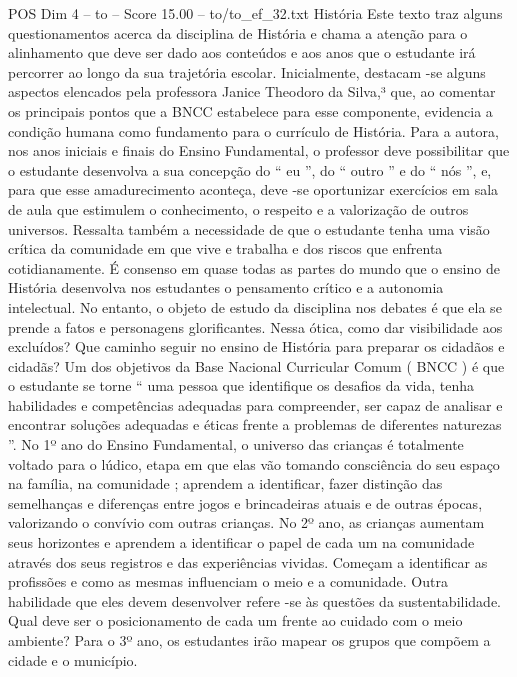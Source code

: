 \begin{textsample}{POS Dim 4 – to – Score 15.00 – to/to\_ef\_32.txt}  \label{ex:f4_pos_201}
História Este texto traz alguns questionamentos acerca da disciplina de História e chama a atenção para o alinhamento que deve ser dado aos conteúdos e aos anos que o estudante irá percorrer ao longo da sua trajetória escolar.
Inicialmente, destacam -se alguns aspectos elencados pela professora Janice Theodoro da Silva,³ que, ao comentar os principais pontos que a BNCC estabelece para esse componente, evidencia a condição humana como fundamento para o currículo de História.
Para a autora, nos anos iniciais e finais do Ensino Fundamental, o professor deve possibilitar que o estudante desenvolva a sua concepção do “ eu ”, do “ outro ” e do “ nós ”, e, para que esse amadurecimento aconteça, deve -se oportunizar exercícios em sala de aula que estimulem o conhecimento, o respeito e a valorização de outros universos.
Ressalta também a necessidade de que o estudante tenha uma visão crítica da comunidade em que vive e trabalha e dos riscos que enfrenta cotidianamente.
É consenso em quase todas as partes do mundo que o ensino de História desenvolva nos estudantes o pensamento crítico e a autonomia intelectual.
No entanto, o objeto de estudo da disciplina nos debates é que ela se prende a fatos e personagens glorificantes.
Nessa ótica, como dar visibilidade aos excluídos?
Que caminho seguir no ensino de História para preparar os cidadãos e cidadãs?
Um dos objetivos da Base Nacional Curricular Comum ( BNCC ) é que o estudante se torne “ uma pessoa que identifique os desafios da vida, tenha habilidades e competências adequadas para compreender, ser capaz de analisar e encontrar soluções adequadas e éticas frente a problemas de diferentes naturezas ”.
No 1º ano do Ensino Fundamental, o universo das crianças é totalmente voltado para o lúdico, etapa em que elas vão tomando consciência do seu espaço na família, na comunidade ; aprendem a identificar, fazer distinção das semelhanças e diferenças entre jogos e brincadeiras atuais e de outras épocas, valorizando o convívio com outras crianças.
No 2º ano, as crianças aumentam seus horizontes e aprendem a identificar o papel de cada um na comunidade através dos seus registros e das experiências vividas.
Começam a identificar as profissões e como as mesmas influenciam o meio e a comunidade.
Outra habilidade que eles devem desenvolver refere -se às questões da sustentabilidade.
Qual deve ser o posicionamento de cada um frente ao cuidado com o meio ambiente?
Para o 3º ano, os estudantes irão mapear os grupos que compõem a cidade e o município.

\end{textsample}
